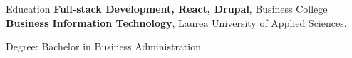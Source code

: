 \begin{rubric}{Education}
 \entry*[\phantom{ii}01/24 - 12/24]%
	\textbf{Full-stack Development, React, Drupal}, Business College
%
\entry*[2016 - 2021]%
	\textbf{Business Information Technology}, Laurea University of Applied Sciences.\par
    Degree: Bachelor in Business Administration
\end{rubric}